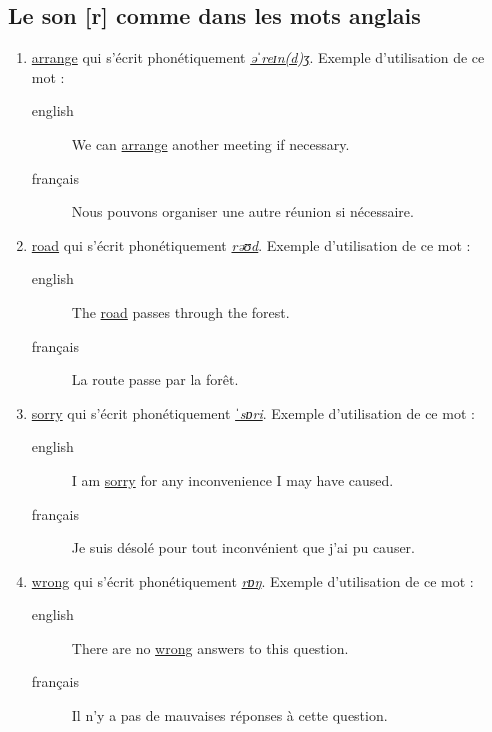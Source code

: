 \documentclass[12pt,a4paper]{book}
\begin{document}
\subsection{Le son [r] comme dans les mots anglais}
\label{sec:org5353d95}
\begin{enumerate}
\item \href{http://www.wordreference.com/enfr/arrange}{arrange} qui s'écrit phonétiquement \href{https://en.oxforddictionaries.com/definition/arrange}{\emph{əˈreɪn(d)ʒ}}. Exemple
d'utilisation de ce mot :
\begin{description}
\item[{english}] \textenglish{We can \href{https://youtu.be/oD5RzpwbrIc}{arrange} another meeting if necessary.}
\item[{français}] Nous pouvons organiser une autre réunion si
nécessaire.
\end{description}
\item \href{http://www.wordreference.com/enfr/road}{road} qui s'écrit phonétiquement \href{https://en.oxforddictionaries.com/definition/road}{\emph{rəʊd}}. Exemple d'utilisation de ce
mot :
\begin{description}
\item[{english}] \textenglish{The \href{https://youtu.be/bO2xMNU9bTw}{road} passes through the forest.}
\item[{français}] La route passe par la forêt.
\end{description}
\item \href{http://www.wordreference.com/enfr/sorry}{sorry} qui s'écrit phonétiquement \href{https://en.oxforddictionaries.com/definition/sorry}{\emph{ˈsɒri}}. Exemple d'utilisation de
ce mot :
\begin{description}
\item[{english}] \textenglish{I am \href{https://youtu.be/ahCwKDyS5OE}{sorry} for any inconvenience I may have caused.}
\item[{français}] Je suis désolé pour tout inconvénient que j'ai pu causer.
\end{description}
\item \href{http://www.wordreference.com/enfr/wrong}{wrong} qui s'écrit phonétiquement \href{https://en.oxforddictionaries.com/definition/wrong}{\emph{rɒŋ}}. Exemple d'utilisation de ce
mot :
\begin{description}
\item[{english}] \textenglish{There are no \href{https://youtu.be/a5e0z1\_uwHY}{wrong} answers to this question.}
\item[{français}] Il n'y a pas de mauvaises réponses à cette question.
\end{description}
\end{enumerate}
\end{document}
